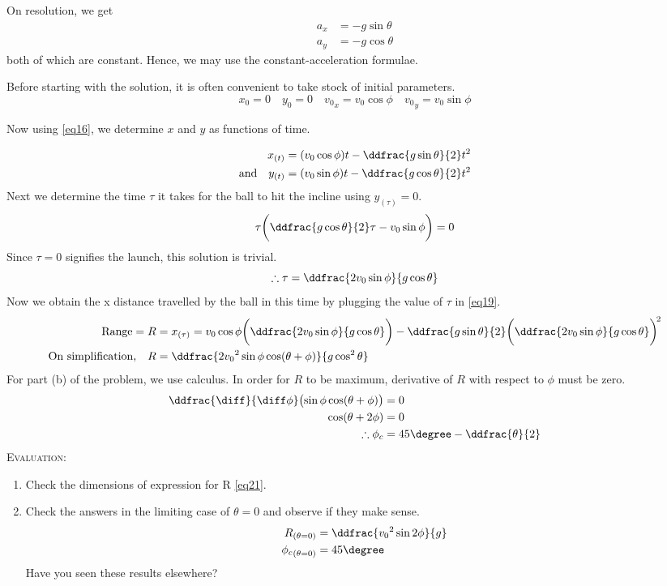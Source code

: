 On resolution, we get
\begin{align*}
a_x &= -g\sin\theta \\
a_y &= -g\cos\theta
\end{align*}
both of which are constant. Hence, we may use the constant-acceleration formulae.

Before starting with the solution, it is often convenient to take stock of initial parameters.
\begin{equation*}
{x_0}=0 \quad {y_0}=0 \quad {v_0}_x=v_0\cos\phi \quad {v_0}_y=v_0\sin\phi
\end{equation*}

Now using \eqref{eq16}, we determine $x$ and $y$ as functions of time.

\begin{align}
x_{(t)} &= (v_0\cos\phi)t - \ddfrac{g\sin\theta}{2}t^2 \label{eq19}\\
\text{and} \quad y_{(t)} &= (v_0\sin\phi)t - \ddfrac{g\cos\theta}{2}t^2 \label{eq20}
\end{align}
Next we determine the time $\tau$ it takes for the ball to hit the incline using $y_{(\tau)}=0$.
\begin{equation*}
\tau\biggl(\ddfrac{g\cos\theta}{2}\tau-v_0\sin\phi\biggr)=0
\end{equation*}
Since $\tau=0$ signifies the launch, this solution is trivial.
\begin{equation*}
\therefore \tau= \ddfrac{2v_0\sin\phi}{g\cos\theta}
\end{equation*}
Now we obtain the x distance travelled by the ball in this time by plugging the value of $\tau$ in \eqref{eq19}.
\begin{align}
\text{Range}=R&=x_{(\tau)}=v_0\cos\phi\biggl(\ddfrac{2v_0\sin\phi}{g\cos\theta}\biggr)-\ddfrac{g\sin\theta}{2}\biggl(\ddfrac{2v_0\sin\phi}{g\cos\theta}\biggr)^{\!2}\nonumber\\
\text{On simplification,}\quad R&= \ddfrac{2{v_0}^2\sin\phi\cos(\theta+\phi)}{g\cos^2\theta}\label{eq21}
\end{align}
For part (b) of the problem, we use calculus. In order for $R$ to be maximum, derivative of $R$ with respect to $\phi$ must be zero.
\begin{align}
\ddfrac{\diff}{\diff \phi}\bigl(\sin\phi\cos(\theta+\phi)\bigr)&=0\nonumber\\
\cos(\theta+2\phi)&=0\nonumber\\
\therefore\phi_c&=45\degree-\ddfrac{\theta}{2}\label{eq22}
\end{align}
\textsc{Evaluation:}
\begin{enumerate}

\item Check the dimensions of expression for R \eqref{eq21}.

\item Check the answers in the limiting case of $\theta=0$ and observe if they make sense.
\begin{align*}
R_{(\theta=0)}&=\ddfrac{{v_0}^2\sin2\phi}{g}\\
{\phi_c}_{(\theta=0)}&=45\degree
\end{align*}
Have you seen these results elsewhere?

\end{enumerate}

